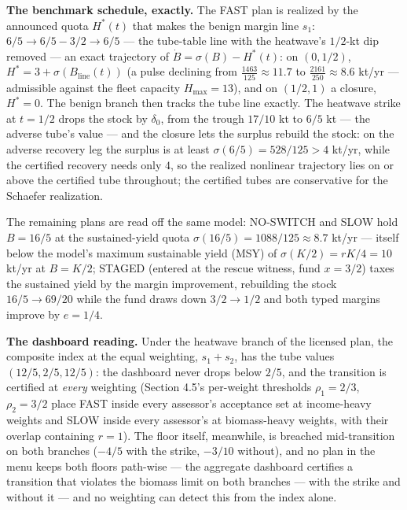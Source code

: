 \documentclass[3p,11pt]{elsarticle}
\begin{document}
\textbf{The benchmark schedule, exactly.} The FAST plan is realized by the
announced quota \(H^*(t)\) that makes the benign margin line
\(s_1\): \(6/5 \to 6/5 - 3/2 \to 6/5\) --- the tube-table line with the
heatwave's \(1/2\)-kt dip removed --- an exact trajectory
of \(\dot B = \sigma(B) - H^*(t)\): on \((0, 1/2)\),
\(H^* = 3 + \sigma(B_{\mathrm{line}}(t))\) (a pulse declining from
\(\tfrac{1463}{125} \approx 11.7\) to \(\tfrac{2161}{250} \approx 8.6\) kt/yr
--- admissible against the fleet capacity \(H_{\max} = 13\)), and on
\((1/2, 1)\) a closure, \(H^* = 0\). The benign branch then tracks the tube
line exactly. The heatwave strike at \(t = 1/2\) drops the stock by
\(\delta_0\), from the trough \(17/10\) kt to \(6/5\) kt --- the adverse
tube's value --- and the closure lets the surplus rebuild the stock: on the adverse
recovery leg the surplus is at least \(\sigma(6/5) = 528/125 > 4\) kt/yr,
while the certified recovery needs only \(4\), so the realized nonlinear
trajectory lies on or above the certified tube throughout; the certified
tubes are conservative for the Schaefer realization.

The remaining plans are
read off the same model: NO-SWITCH and SLOW hold \(B = 16/5\) at the
sustained-yield quota \(\sigma(16/5) = 1088/125 \approx 8.7\) kt/yr ---
itself below the model's maximum sustainable yield (MSY) of
\(\sigma(K/2) = rK/4 = 10\) kt/yr at \(B = K/2\); STAGED
(entered at the rescue witness, fund \(x = 3/2\)) taxes the sustained yield
by the margin improvement, rebuilding the stock
\(16/5 \to 69/20\) while the fund draws down \(3/2 \to 1/2\) and both typed
margins improve by \(e = 1/4\).

\textbf{The dashboard reading.} Under the heatwave branch of the
licensed plan, the composite index at the equal weighting, \(s_1 + s_2\),
has the tube values \((12/5, 2/5, 12/5)\): the dashboard never drops below
\(2/5\), and the transition is certified at \emph{every} weighting
(Section 4.5's per-weight thresholds \(\rho_1 = 2/3\), \(\rho_2 = 3/2\) place
FAST inside every assessor's acceptance set at income-heavy weights and SLOW
inside every assessor's at biomass-heavy weights, with their overlap
containing \(r = 1\)). The floor itself, meanwhile, is breached
mid-transition on both branches (\(-4/5\) with the strike, \(-3/10\)
without), and no plan in the menu keeps both floors path-wise --- the
aggregate dashboard certifies a transition that violates the biomass limit
on both branches --- with the strike and without it --- and no weighting
can detect this from the index alone.
\end{document}

